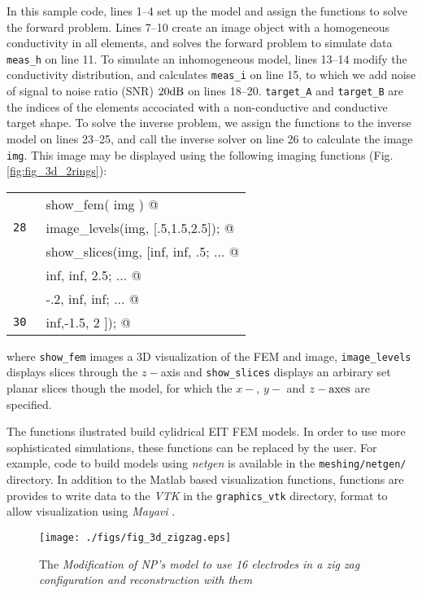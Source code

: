 \documentclass[12pt]{iopart}
\makeatletter
\newcommand{\CN}{\tt\small} %
\newcommand{\CC}{&\verb@}   % start code
\makeatother
\begin{document}
In this sample code, lines 1--4 set up the model and assign
the functions to solve the forward problem.
Lines 7--10 create an image object with a homogeneous
conductivity in all elements, and solves the forward
problem to simulate data {\tt meas\_h} on line 11. To simulate an
inhomogeneous model, lines 13--14 modify the conductivity
distribution, and calculates {\tt meas\_i} on line 15,
to which we add noise of signal to noise ratio (SNR) $20\rm dB$
on lines 18--20.
{\tt target\_A} and {\tt target\_B} are the indices of the 
elements accociated with a non-conductive and conductive
target shape.
To solve the inverse problem, we assign the functions to
the inverse model on lines 23--25, and call the inverse solver
on line 26 to calculate the image {\tt img}. This image
may be displayed using the following imaging functions
(Fig. \ref{fig:fig_3d_2rings}):

\begin{tabular}{ll}
\CN    \CC show_fem( img ) @\\
\CN 28 \CC image_levels(img, [.5,1.5,2.5]); @\\
\CN    \CC show_slices(img, [inf, inf, .5; ... @\\
\CN    \CC                   inf, inf, 2.5; ... @\\
\CN    \CC                   -.2, inf, inf; ... @\\
\CN 30 \CC                   inf,-1.5,   2 ]); @\\
\end{tabular}

where {\tt show\_fem} images a 3D visualization of the
FEM and image, {\tt image\_levels} displays slices through
the $z-$axis and {\tt show\_slices} displays an
arbirary set planar slices though the model, for which the
$x-$, $y-$ and $z-\rm axes$ are specified.

The functions ilustrated
build cylidrical EIT FEM models. In order to use more
sophisticated simulations, these functions can be replaced
by the user. For example, code to build models using {\em netgen}
\cite{Schoberl_1997}  is available in the
{\tt meshing/netgen/} directory.
In addition to the Matlab based visualization functions,
functions are provides to write data to the {\em VTK}
in the {\tt graphics\_vtk} directory,
format to allow visualization using {\em Mayavi}
\cite{Ramachandran_2003}.

%
%
\begin{figure}[th]
\begin{flushright}
\texttt{[image: ./figs/fig\_3d\_zigzag.eps]}
\caption{\small The 
{\em Modification of NP's model to use 16 electrodes in a
zig zag configuration and reconstruction with them}
 \label{fig:fig_3d_zigzag}
}
\end{flushright}
\end{figure}
\end{document}
